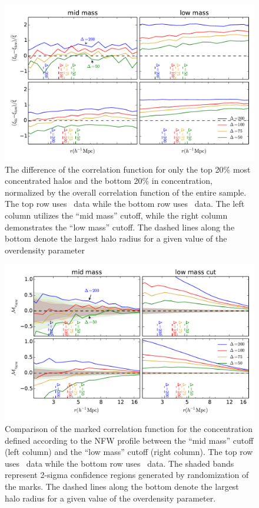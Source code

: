 \documentclass[usenatbib,usegraphicx,letterpaper]{mn2e}
\begin{document}
\begin{figure}
	\centering
	\includegraphics[width=.9\textwidth]{all_cfhilow_z00_hostsvlow.pdf}
	\caption{The difference of the correlation function for only the top 20\% most concentrated halos and the bottom 20\% in concentration, normalized by the overall correlation function of the entire sample. The top row uses \simA \  data while the bottom row uses \simB \ data. The left column utilizes the ``mid mass'' cutoff, while the right column demonstrates the ``low mass'' cutoff. The dashed lines along the bottom denote the largest halo radius for a given value of the overdensity parameter}
	\label{fig:hvl_cfcompare}
\end{figure}

\begin{figure}
	\centering
	\includegraphics[width=.9\textwidth]{all_mcf_cnfw_z00_hostsvlow.pdf}
	\caption{Comparison of the marked correlation function for the concentration defined according to the NFW profile between the ``mid mass'' cutoff (left column) and the ``low mass'' cutoff (right column). The top row uses \simA \ data while the bottom row uses \simB \ data. The shaded bands represent 2-sigma confidence regions generated by randomization of the marks. The dashed lines along the bottom denote the largest halo radius for a given value of the overdensity parameter.}
	\label{fig:hvl_mcf_cnfw}
\end{figure}
\end{document}
